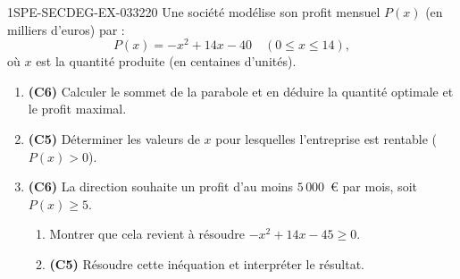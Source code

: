 \begin{exercice}{1SPE-SECDEG-EX-033}{2}{20}
Une société modélise son profit mensuel $P(x)$ (en milliers d'euros) par :
\[P(x) = -x^2 + 14x - 40 \quad (0 \leqslant x \leqslant 14),\]
où $x$ est la quantité produite (en centaines d'unités).

\begin{enumerate}
  \item \textbf{(C6)} Calculer le sommet de la parabole et en déduire la quantité optimale et le profit maximal.
  \item \textbf{(C5)} Déterminer les valeurs de $x$ pour lesquelles l'entreprise est rentable ($P(x) > 0$).
  \item \textbf{(C6)} La direction souhaite un profit d'au moins $5\,000$~\euro{} par mois, soit $P(x) \geqslant 5$.
  \begin{enumerate}
    \item Montrer que cela revient à résoudre $-x^2 + 14x - 45 \geqslant 0$.
    \item \textbf{(C5)} Résoudre cette inéquation et interpréter le résultat.
  \end{enumerate}
\end{enumerate}
\end{exercice}
